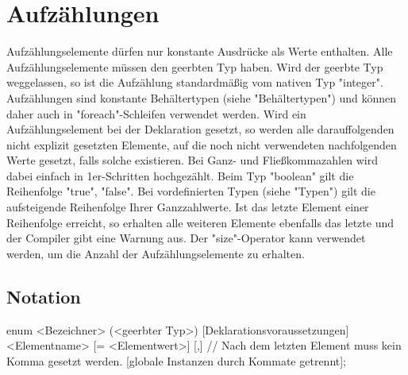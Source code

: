 \chapter{Aufzählungen}
Aufzählungselemente dürfen nur konstante Ausdrücke als Werte enthalten.
Alle Aufzählungselemente müssen den geerbten Typ haben.
Wird der geerbte Typ weggelassen, so ist die Aufzählung standardmäßig vom nativen Typ "integer".
Aufzählungen sind konstante Behältertypen (siehe "Behältertypen") und können daher auch in "foreach"-Schleifen verwendet werden.
Wird ein Aufzählungselement bei der Deklaration gesetzt, so werden alle darauffolgenden nicht explizit gesetzten Elemente,
auf die noch nicht verwendeten nachfolgenden Werte gesetzt, falls solche existieren.
Bei Ganz- und Fließkommazahlen wird dabei einfach in 1er-Schritten hochgezählt.
Beim Typ "boolean" gilt die Reihenfolge "true", "false". Bei vordefinierten Typen (siehe "Typen") gilt die aufsteigende
Reihenfolge Ihrer Ganzzahlwerte.
Ist das letzte Element einer Reihenfolge erreicht, so erhalten alle weiteren Elemente ebenfalls das letzte
und der Compiler gibt eine Warnung aus.
Der "size"-Operator kann verwendet werden, um die Anzahl der Aufzählungselemente zu erhalten. 

\section{Notation}
enum <Bezeichner> (<geerbter Typ>) [Deklarationsvoraussetzungen]
{
    <Elementname> [= <Elementwert>] [,] // Nach dem letzten Element muss kein Komma gesetzt werden.
} [globale Instanzen durch Kommate getrennt];
